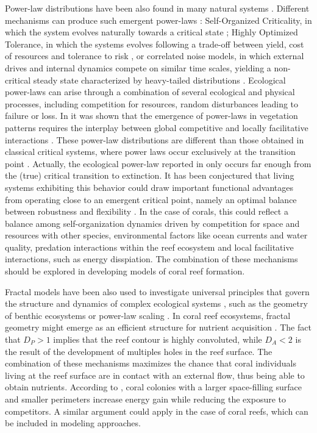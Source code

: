 Power-law distributions have been also found in many natural systems
\cite{SOLE1995, west2000scaling, Brown2002, Chave2003, Marquet2005,
    Corral2019}.
Different mechanisms can produce such emergent power-laws
\cite{Markovic2014}: Self-Organized Criticality, in which the system evolves
naturally towards a critical state \cite{Per1988}; Highly Optimized Tolerance,
in which the systems evolves following a trade-off between yield, cost of
resources and tolerance to risk \cite{Carlson1999,Carlson2000}, or correlated
noise models, in which external drives and internal dynamics compete on similar
time scales, yielding a non-critical steady state characterized by heavy-tailed
distributions \cite{Newman1996}. Ecological power-laws can arise through a
combination of several ecological and physical processes, including competition
for resources, random disturbances leading to failure or loss. In
\cite{Scanlon2007, Kefi2007} it was shown that the emergence of power-laws in
vegetation patterns requires the interplay between global competitive and
locally facilitative interactions \cite{Scanlon2007, Kefi2007}. These power-law
distributions are different than those obtained in classical critical systems,
where power laws occur exclusively at the transition point
\cite{Wilson1979,Binney1995}. Actually, the ecological power-law reported in
\cite{Kefi2007} only occurs far enough from the (true) critical transition to
extinction. It has been conjectured that living systems exhibiting this
behavior could draw important functional advantages from operating close to an
emergent critical point, namely an optimal balance between robustness and
flexibility \cite{Munoz2018}. In the case of corals, this could reflect a
balance among self-organization dynamics driven by competition for space and
resources with other species, environmental factors like ocean currents and
water quality, predation interactions within the reef ecosystem and local
facilitative interactions, such as energy disspiation. The combination of these
mechanisms should be explored in developing models of coral reef formation.

Fractal models have been also used to investigate universal principles that
govern the structure and dynamics of complex ecological systems
\cite{Brown2002}, such as the geometry of benthic ecosystems or power-law
scaling \cite{Schmid1999}. In coral reef ecosystems, fractal geometry might
emerge as an efficient structure for nutrient acquisition \cite{Sous2020}. The
fact that $D_P>1$ implies that the reef contour is highly convoluted, while
$D_A<2$ is the result of the development of multiples holes in the reef
surface. The combination of these mechanisms maximizes the chance that coral
individuals living at the reef surface are in contact with an external flow,
thus being able to obtain nutrients. According to \cite{George2021}, coral
colonies with a larger space-filling surface and smaller perimeters increase
energy gain while reducing the exposure to competitors. A similar argument
could apply in the case of coral reefs, which can be included in modeling
approaches.

